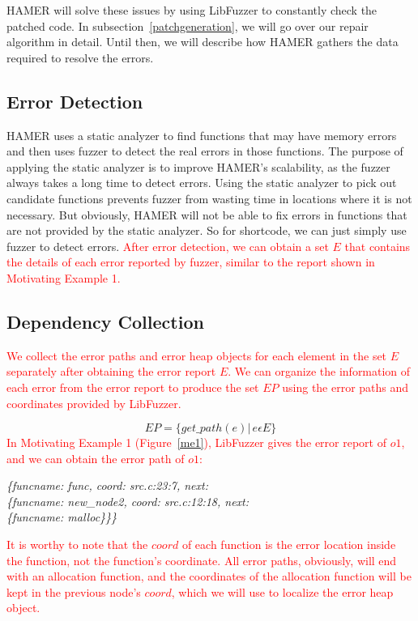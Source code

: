 \documentclass[a4j,dvipdfmx]{article}
\begin{document}
HAMER will solve these issues by using LibFuzzer to constantly check the patched code. In subsection~\ref{patchgeneration}, we will go over our repair algorithm in detail. Until then, we will describe how HAMER gathers the data required to resolve the errors.

\subsection{Error Detection}
HAMER uses a static analyzer to find functions that may have memory errors and then uses fuzzer to detect the real errors in those functions. The purpose of applying the static analyzer is to improve HAMER's scalability, as the fuzzer always takes a long time to detect errors. Using the static analyzer to pick out candidate functions prevents fuzzer from wasting time in locations where it is not necessary. But obviously, HAMER will not be able to fix errors in functions that are not provided by the static analyzer. So for shortcode, we can just simply use fuzzer to detect errors. \textcolor{red}{After error detection, we can obtain a set $E$ that contains the details of each error reported by fuzzer, similar to the report shown in Motivating Example 1.}


\subsection{Dependency Collection}

\textcolor{red}{
We collect the error paths and error heap objects for each element in the set $E$ separately after obtaining the error report $E$. We can organize the information of each error from the error report to produce the set $EP$ using the error paths and coordinates provided by LibFuzzer. 
}

\begin{equation}
EP=\{get\_path(e)|\, e \epsilon E\}
\end{equation}
\textcolor{red}{
In Motivating Example 1 (Figure~\ref{me1}), LibFuzzer gives the error report of $o1$, and we can obtain the error path of $o1$:
}

\begin{minipage}{\textwidth}
\vspace{0.2cm}
\textsl{\hspace{0.3cm}\{funcname: func, coord: src.c:23:7, next:\\\hspace{0.6cm}\{funcname: new\_node2, coord: src.c:12:18, next:\\\hspace{0.9cm}\{funcname: malloc\}\}\}}
\vspace{0.2cm}
\end{minipage}
\textcolor{red}{
It is worthy to note that the $coord$ of each function is the error location inside the function, not the function's coordinate. All error paths, obviously, will end with an allocation function, and the coordinates of the allocation function will be kept in the previous node's $coord$, which we will use to localize the error heap object.
}
\end{document}
